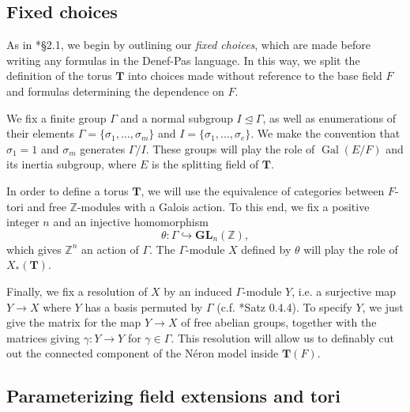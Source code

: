 \documentclass{amsart}
\newcommand{\Z}{{\mathbb Z}}
\newcommand{\GL}{\mathbf {GL}}
\newcommand{\bT}{\mathbf {T}}
\newcommand\spl{\mathrm{spl}}
\DeclareMathOperator{\Gal}{Gal}
\theoremstyle{plain}
\theoremstyle{definition}
\begin{document}
\subsection{Fixed choices}

As in \cite{hales:transfert}*{\S 2.1}, we begin by outlining our \emph{fixed choices}, which are made before writing any formulas in the Denef-Pas language.  
In this way, we split the definition of the torus $\bT$ into choices made without reference to the base field $F$ and formulas determining the dependence on $F$.

We fix a finite group $\Gamma$ and a normal subgroup $I \unlhd \Gamma$, as well as enumerations of their elements $\Gamma = \{\sigma_1, \dots, \sigma_m\}$ and $I = \{\sigma_1, \dots, \sigma_e\}$.  We make the convention that $\sigma_1 = 1$ and $\sigma_m$ generates $\Gamma / I$.  These groups will play the role of $\Gal(E/F)$ and its inertia subgroup, where $E$ is the splitting field of $\bT$.

In order to define a torus $\bT$, we will use the equivalence of categories between $F$-tori and free $\Z$-modules with a Galois action.  To this end, we fix a positive integer $n$ and an injective homomorphism
\begin{equation} \label{eq:theta}
\theta : \Gamma \hookrightarrow \GL_n(\Z),
\end{equation}
which gives $\Z^n$ an action of $\Gamma$.  The $\Gamma$-module $X$ defined by $\theta$ will play the role of $X_\ast(\bT)$.

Finally, we fix a resolution of $X$ by an induced $\Gamma$-module $Y$, i.e. a surjective map $Y \to X$ where $Y$ has a basis permuted by $\Gamma$ (c.f. \cite{brahm}*{Satz 0.4.4}).  To specify $Y$, we just give the matrix for the map $Y \to X$ of free abelian groups, together with the matrices giving $\gamma : Y \to Y$ for $\gamma \in \Gamma$. This resolution will allow us to definably cut out the connected component of the N\'eron model inside $\bT(F)$.



\subsection{Parameterizing field extensions and tori}
 
\end{document}
